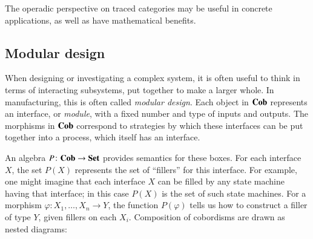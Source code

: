 \documentclass[12pt,oneside,article,draft]{memoir}
\begin{document}
The operadic perspective on traced categories may be useful in concrete applications, as well as have mathematical benefits.

\subsection{Modular design}

When designing or investigating a complex system, it is often useful to think in terms of interacting subsystems, put together to make a larger whole.
In manufacturing, this is often called \emph{modular design}.
Each object in $\mathbf{Cob}$ represents an interface, or \emph{module}, with a fixed number and type of inputs and outputs.
The morphisms in $\mathbf{Cob}$ correspond to strategies by which these interfaces can be put together into a process, which itself has an interface. 

An algebra $P\colon\mathbf{Cob}\to\mathbf{Set}$ provides semantics for these boxes.
For each interface $X$, the set $P(X)$ represents the set of ``fillers'' for this interface.
For example, one might imagine that each interface $X$ can be filled by any state machine having that interface; in this case $P(X)$ is the set of such state machines.
For a morphism $\varphi\colon X_1,\ldots,X_n\to Y$, the function $P(\varphi)$ tells us how to construct a filler of type $Y$, given fillers on each $X_i$.
Composition of cobordisms are drawn as nested diagrams:
\end{document}

